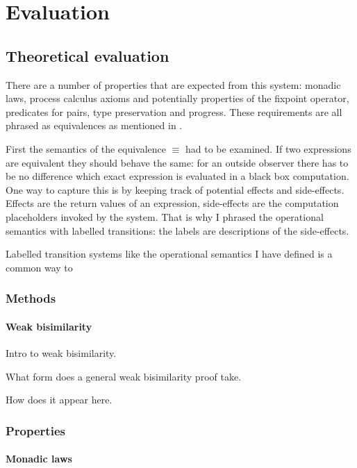 \documentclass[12pt,twoside,notitlepage]{report}
\begin{document}
\cleardoublepage
\chapter{Evaluation}

\section{Theoretical evaluation}
There are a number of properties that are expected from this system: monadic laws, process calculus axioms and potentially properties of the fixpoint operator, predicates for pairs, type preservation and progress. These requirements are all phrased as equivalences as mentioned in . 

First the semantics of the equivalence $ \equiv $ had to be examined. If two expressions are equivalent they should behave the same: for an outside observer there has to be no difference which exact expression is evaluated in a black box computation. One way to capture this is by keeping track of potential effects and side-effects. Effects are the return values of an expression, side-effects are the computation placeholders invoked by the system. That is why I phrased the operational semantics with labelled transitions: the labels are descriptions of the side-effects.

Labelled transition systems like the operational semantics I have defined is a common way to 

\subsection{Methods}



\subsubsection{Weak bisimilarity}
Intro to weak bisimilarity.


What form does a general weak bisimilarity proof take.


How does it appear here.
\subsection{Properties}
\subsubsection{Monadic laws}
\end{document}
